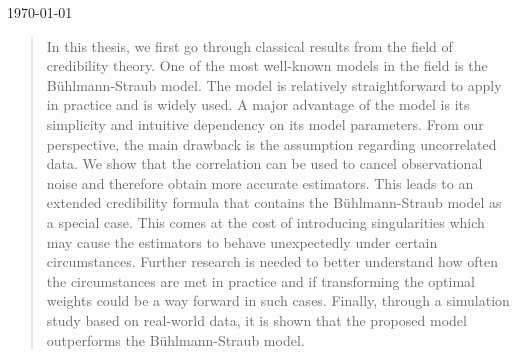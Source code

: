 \documentclass[11pt]{article}
\theoremstyle{definition}
\begin{document}
\begin{titlepage}


{\large \today}\\[2cm] %


 

\vfill %

\end{titlepage}

\begin{abstract}
In this thesis, we first go through classical results from the field of credibility theory. One of the most well-known models in the field is the Bühlmann-Straub model. The model is relatively straightforward to apply in practice and is widely used. A major advantage of the model is its simplicity and intuitive dependency on its model parameters. From our perspective, the main drawback is the assumption regarding uncorrelated data. We show that the correlation can be used to cancel observational noise and therefore obtain more accurate estimators. This leads to an extended credibility formula that contains the Bühlmann-Straub model as a special case. This comes at the cost of introducing singularities which may cause the estimators to behave unexpectedly under certain circumstances. Further research is needed to better understand how often the circumstances are met in practice and if transforming the optimal weights could be a way forward in such cases. Finally, through a simulation study based on real-world data, it is shown that the proposed model outperforms the Bühlmann-Straub model.

\end{abstract}
\newpage
\end{document}

